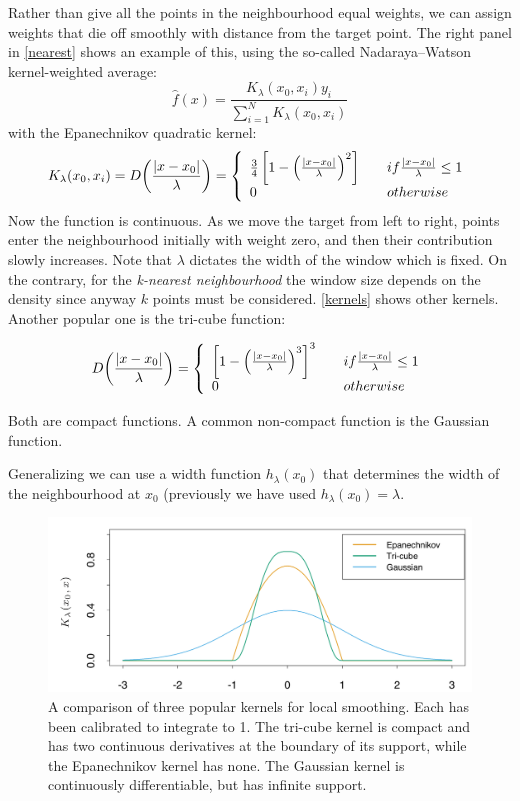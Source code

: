 \documentclass[12pt, letterpaper]{article}
\theoremstyle{definition}
\DeclarePairedDelimiter\autobracket{(}{)}
\newcommand{\br}[1]{\autobracket*{#1}}
\begin{document}
Rather than give all the points in the neighbourhood equal weights, we can assign weights that die off smoothly with distance from the target point. The right panel in \autoref{nearest} shows an example of this, using the so-called Nadaraya–Watson kernel-weighted average:
\begin{equation}
\hat{f}(x) = \frac{K_\lambda(x_0, x_i)y_i}{\sum_{i=1}^N K_\lambda(x_0, x_i)}
\end{equation}
with the Epanechnikov quadratic kernel:
\begin{equation}
K_\lambda(x_0, x_i)= D\br{\frac{|x-x_0|}{\lambda}} = \left\{ \begin{array}{ll}  \frac{3}{4}\left[1-\left(\frac{|x-x_0|}{\lambda} \right)^2 \right]&\quad if \frac{|x-x_0|}{\lambda}\le 1\\
0 &\quad otherwise
\end{array}
 \right.
\end{equation}
Now the function is continuous. As we move the target from left to right, points enter the neighbourhood initially with weight zero, and then their contribution slowly increases. Note that $\lambda$ dictates the width of the window which is fixed. On the contrary, for the \textit{k-nearest neighbourhood} the window size depends on the density since anyway $k$ points must be considered. \autoref{kernels} shows other kernels. Another popular one is the tri-cube function:

\begin{equation}
 D\br{\frac{|x-x_0|}{\lambda}} = \left\{ \begin{array}{ll}  \left[1-\left(\frac{|x-x_0|}{\lambda} \right)^3 \right]^3&\quad if \frac{|x-x_0|}{\lambda}\le 1\\
0 &\quad otherwise
\end{array}
 \right.
\end{equation}

Both are compact functions. A common non-compact function is the Gaussian function.

Generalizing we can use a width function $h_\lambda(x_0)$ that determines the width of the neighbourhood at $x_0$ (previously we have used $h_\lambda(x_0) = \lambda$.

\begin{figure}
\centering
\includegraphics[scale=0.4]{img/kernels}
\caption{A comparison of three popular kernels for local smoothing. Each has been calibrated to integrate to 1. The tri-cube kernel is compact and has two continuous derivatives at the boundary of its support, while the Epanechnikov kernel has none. The Gaussian kernel is continuously differentiable, but has infinite support.}
\label{kernels}
\end{figure}
\end{document}
